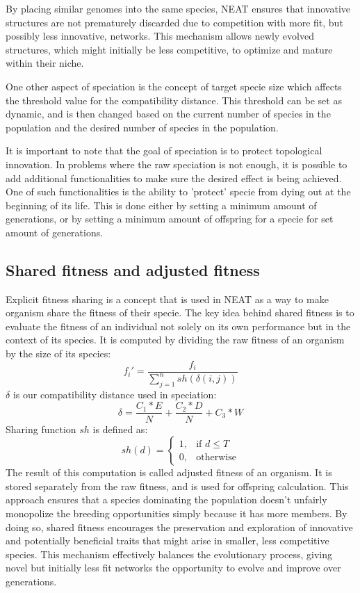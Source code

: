 \documentclass{article}
\begin{document}
By placing similar genomes into the same species, NEAT ensures that innovative structures are not prematurely discarded due to competition with more fit,
but possibly less innovative, networks.
This mechanism allows newly evolved structures, which might initially be less competitive, to optimize and mature within their niche.

One other aspect of speciation is the concept of target specie size which affects the threshold value for the compatibility distance.
This threshold can be set as dynamic, and is then changed based on the current number of species in the population and
the desired number of species in the population.

It is important to note that the goal of speciation is to protect topological innovation. In problems where the raw speciation is not enough,
it is possible to add additional functionalities to make sure the desired effect is being achieved. One of such functionalities is 
the ability to 'protect' specie from dying out at the beginning of its life. This is done either by setting a minimum amount of generations,
or by setting a minimum amount of offspring for a specie for set amount of generations.

\subsection{Shared fitness and adjusted fitness}
Explicit fitness sharing \cite{Grefenstette_2013} is a concept that is used in NEAT as a way to make organism share the fitness of their specie.
The key idea behind shared fitness is to evaluate the fitness of an individual not solely on its own performance but in the context of its species.
It is computed by dividing the raw fitness of an organism by the size of its species:
$$f_i' = \frac{f_i}{\sum_{j=1}^{n}{sh(\delta(i,j))}}$$
$\delta$ is our compatibility distance used in speciation:  $$\delta = \frac{C_1*E}  {N} + \frac{C_2*D} {N} + C_3*W$$ 
Sharing function $sh$ is defined as:
\[
    sh(d)= 
\begin{cases}
    1,& \text{if } d \leq T
\\
    0,              & \text{otherwise}
\end{cases}
\]
The result of this computation is called adjusted fitness of an organism. It is stored separately from the raw fitness, and is used for offspring calculation.
This approach ensures that a species dominating the population doesn't unfairly monopolize the breeding opportunities simply because it has more members.
By doing so, shared fitness encourages the preservation and exploration of innovative and potentially beneficial traits that might arise in smaller,
less competitive species. This mechanism effectively balances the evolutionary process,
giving novel but initially less fit networks the opportunity to evolve and improve over generations.
\end{document}
